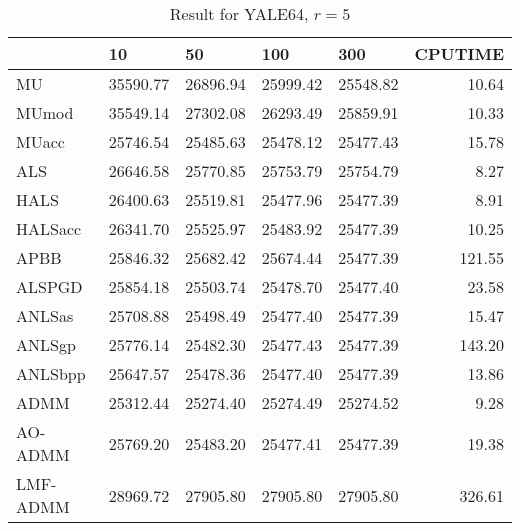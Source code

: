 \documentclass{article}
\begin{document}
\begin{table}[H]
		\caption{Result for YALE64, $r = 5$}
	\centering 
	\begin{tabular}{|l|r|r|r|r|r|}
		\hline
		& \multicolumn{1}{l|}{10} & \multicolumn{1}{l|}{50} & \multicolumn{1}{l|}{100} & \multicolumn{1}{l|}{300} & \multicolumn{1}{l|}{CPUTIME} \\ \hline
		MU       & 35590.77                & 26896.94                & 25999.42                 & 25548.82                 & 10.64                        \\ \hline
		MUmod    & 35549.14                & 27302.08                & 26293.49                 & 25859.91                 & 10.33                        \\ \hline
		MUacc    & 25746.54                & 25485.63                & 25478.12                 & 25477.43                 & 15.78                        \\ \hline
		ALS      & 26646.58                & 25770.85                & 25753.79                 & 25754.79                 & 8.27                         \\ \hline
		HALS     & 26400.63                & 25519.81                & 25477.96                 & 25477.39                 & 8.91                         \\ \hline
		HALSacc  & 26341.70                & 25525.97                & 25483.92                 & 25477.39                 & 10.25                        \\ \hline
		APBB     & 25846.32                & 25682.42                & 25674.44                 & 25477.39                 & 121.55                       \\ \hline
		ALSPGD   & 25854.18                & 25503.74                & 25478.70                 & 25477.40                 & 23.58                        \\ \hline
		ANLSas   & 25708.88                & 25498.49                & 25477.40                 & 25477.39                 & 15.47                        \\ \hline
		ANLSgp   & 25776.14                & 25482.30                & 25477.43                 & 25477.39                 & 143.20                       \\ \hline
		ANLSbpp  & 25647.57                & 25478.36                & 25477.40                 & 25477.39                 & 13.86                        \\ \hline
		ADMM     & 25312.44                & 25274.40                & 25274.49                 & 25274.52                 & 9.28                         \\ \hline
		AO-ADMM  & 25769.20                & 25483.20                & 25477.41                 & 25477.39                 & 19.38                        \\ \hline
		LMF-ADMM & 28969.72                & 27905.80                & 27905.80                 & 27905.80                 & 326.61                       \\ \hline
	\end{tabular}
\end{table}
\end{document}
